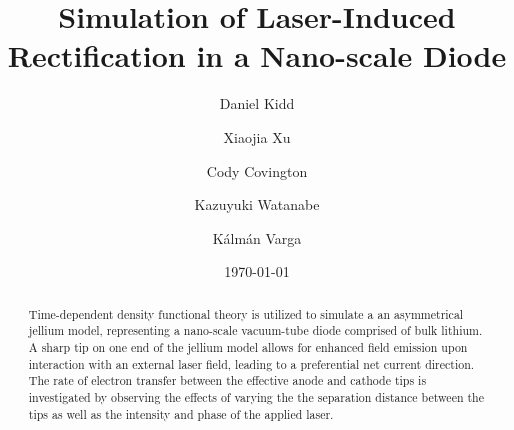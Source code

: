 \documentclass[%
 reprint,
 amsmath,amssymb,
pra,
tightenlines
]{revtex4-1}
\begin{document}
\title{Simulation of Laser-Induced Rectification in a Nano-scale Diode}


\author{Daniel Kidd}
\author{Xiaojia Xu}
\author{Cody Covington}
\author{Kazuyuki Watanabe}
\author{K\'alm\'an Varga}

\date{\today}%


\begin{abstract}
 
Time-dependent density functional theory is utilized to simulate a an asymmetrical jellium model, representing a nano-scale vacuum-tube diode comprised of bulk lithium. A sharp tip on one end of the jellium model allows for enhanced field emission upon interaction with an external laser field, leading to a preferential net current direction. The rate of electron transfer between the effective anode and cathode tips is investigated by observing the effects of varying the the separation distance between the tips as well as the intensity and phase of the applied laser.

\end{abstract}

\maketitle


\end{document}
